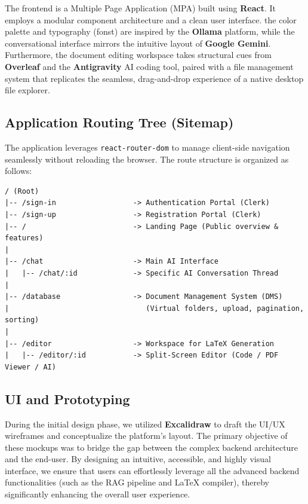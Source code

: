 The frontend is a Multiple Page Application (MPA) built using \textbf{React}. It employs a modular component architecture and a clean user interface. the color palette and typography (fonst) are inspired by the \textbf{Ollama} platform, while the conversational interface mirrors the intuitive layout of \textbf{Google Gemini}. Furthermore, the document editing workspace takes structural cues from \textbf{Overleaf} and the \textbf{Antigravity} AI coding tool, paired with a file management system that replicates the seamless, drag-and-drop experience of a native desktop file explorer. 

\subsection{Application Routing Tree (Sitemap)}
The application leverages \texttt{react-router-dom} to manage client-side navigation seamlessly without reloading the browser. The route structure is organized as follows:

\begin{verbatim}
/ (Root)
|-- /sign-in                  -> Authentication Portal (Clerk)
|-- /sign-up                  -> Registration Portal (Clerk)
|-- /                         -> Landing Page (Public overview & features)
|
|-- /chat                     -> Main AI Interface
|   |-- /chat/:id             -> Specific AI Conversation Thread
|
|-- /database                 -> Document Management System (DMS)
|                                (Virtual folders, upload, pagination, sorting)
|
|-- /editor                   -> Workspace for LaTeX Generation
|   |-- /editor/:id           -> Split-Screen Editor (Code / PDF Viewer / AI)
\end{verbatim}

\subsection{UI and Prototyping}

During the initial design phase, we utilized \textbf{Excalidraw} to draft the UI/UX wireframes and conceptualize the platform's layout. The primary objective of these mockups was to bridge the gap between the complex backend architecture and the end-user. By designing an intuitive, accessible, and highly visual interface, we ensure that users can effortlessly leverage all the advanced backend functionalities (such as the RAG pipeline and LaTeX compiler), thereby significantly enhancing the overall user experience.

